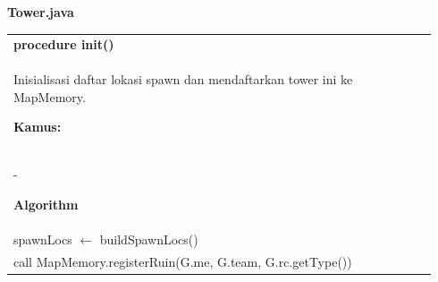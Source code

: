 \documentclass{article}
\newenvironment{pseudobox}
{
\centering
\begin{longtable}{|p{0.94\linewidth}|}
\hline
}
{
\\ \hline
\end{longtable}
\vspace{0.05cm}
}
\begin{document}
\item \textbf{Tower.java}

\begin{pseudobox}
\textbf{procedure init()} \\
{ Inisialisasi daftar lokasi spawn dan mendaftarkan tower ini ke MapMemory. }

\textbf{Kamus:} \\
\hspace*{1em} -

\textbf{Algorithm} \\
\hspace*{1em} spawnLocs $\leftarrow$ buildSpawnLocs() \\
\hspace*{1em} call MapMemory.registerRuin(G.me, G.team, G.rc.getType())
\end{pseudobox}
\end{document}
